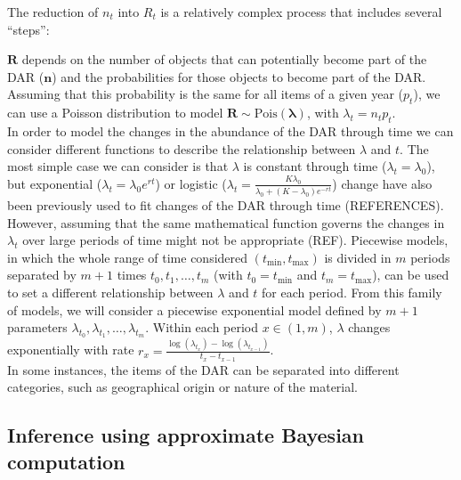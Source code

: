 \documentclass[a4paper]{article}
\begin{document}
 The reduction of $n_t$ into $R_t$ is a relatively complex process that includes several ``steps'': 



 $\bm{R}$ depends on the number of objects that can potentially become part of the DAR ($\bm{n}$) and the probabilities for those objects to become part of the DAR. Assuming that this probability is the same for all items of a given year ($p_t$), we can use a Poisson distribution to model $\bm{R} \sim \mathrm{Pois}(\bm{\lambda})$, with $\lambda_t=n_tp_t$.
\\

In order to model the changes in the abundance of the DAR through time we can consider different functions to describe the relationship between $\lambda$ and $t$. The most simple case we can consider is that $\lambda$ is constant through time ($\lambda_t=\lambda_0$), but exponential ($\lambda_t=\lambda_0e^{rt}$) or logistic ($\lambda_t = \frac{K\lambda_0}{\lambda_0+(K-\lambda_0)e^{-rt}}$) change have also been previously used to fit changes of the DAR through time (REFERENCES). However, assuming that the same mathematical function governs the changes in $\lambda_t$ over large periods of time might not be appropriate (REF). Piecewise models, in which the whole range of time considered $(t_{\mathrm{min}},t_{\mathrm{max}})$ is divided in $m$ periods separated by $m+1$ times $t_0,t_1,\dots,t_{m}$ (with $t_0=t_{\mathrm{min}}$ and $t_{m}=t_{\mathrm{max}}$), can be used to set a different relationship between $\lambda$ and $t$ for each period. From this family of models, we will consider a piecewise exponential model defined by $m+1$ parameters $\lambda_{t_0},\lambda_{t_1},\dots ,\lambda_{t_{m}}$. Within each period $x\in(1,m)$, $\lambda$ changes exponentially with rate $r_x=\frac{\log\left(\lambda_{t_x}\right)-\log\left(\lambda_{t_{x-1}}\right)}{t_x-t_{x-1}}$.
\\

In some instances, the items of the DAR can be separated into different categories, such as geographical origin or nature of the material.
\\

\subsection*{Inference using approximate Bayesian computation}
\end{document}
